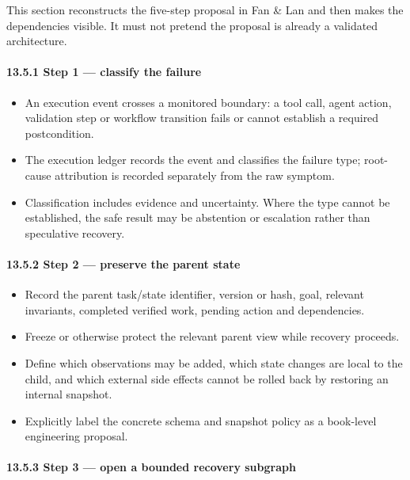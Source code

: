 This section reconstructs the five-step proposal in Fan \& Lan and then makes the dependencies visible. It must not pretend the proposal is already a validated architecture.

\paragraph{13.5.1 Step 1 --- classify the failure}\label{step-1-classify-the-failure}

\begin{itemize}
\tightlist
\item
  An execution event crosses a monitored boundary: a tool call, agent action, validation step or workflow transition fails or cannot establish a required postcondition.
\item
  The execution ledger records the event and classifies the failure type; root-cause attribution is recorded separately from the raw symptom.
\item
  Classification includes evidence and uncertainty. Where the type cannot be established, the safe result may be abstention or escalation rather than speculative recovery.
\end{itemize}

\paragraph{13.5.2 Step 2 --- preserve the parent state}\label{step-2-preserve-the-parent-state}

\begin{itemize}
\tightlist
\item
  Record the parent task/state identifier, version or hash, goal, relevant invariants, completed verified work, pending action and dependencies.
\item
  Freeze or otherwise protect the relevant parent view while recovery proceeds.
\item
  Define which observations may be added, which state changes are local to the child, and which external side effects cannot be rolled back by restoring an internal snapshot.
\item
  Explicitly label the concrete schema and snapshot policy as a book-level engineering proposal.
\end{itemize}

\paragraph{13.5.3 Step 3 --- open a bounded recovery subgraph}\label{step-3-open-a-bounded-recovery-subgraph}

